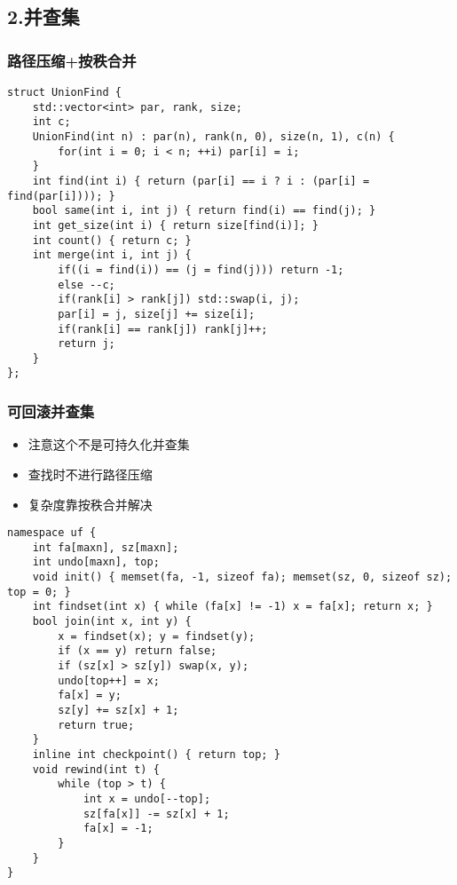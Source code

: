\documentclass[]{article}
\providecommand{\tightlist}{%
  \setlength{\itemsep}{0pt}\setlength{\parskip}{0pt}}
\begin{document}
\hypertarget{ux5e76ux67e5ux96c6}{%
\subsection{2.并查集}\label{ux5e76ux67e5ux96c6}}

\hypertarget{ux8defux5f84ux538bux7f29ux6309ux79e9ux5408ux5e76}{%
\subsubsection{路径压缩+按秩合并}\label{ux8defux5f84ux538bux7f29ux6309ux79e9ux5408ux5e76}}

\begin{verbatim}
struct UnionFind {
    std::vector<int> par, rank, size;
    int c;
    UnionFind(int n) : par(n), rank(n, 0), size(n, 1), c(n) {
        for(int i = 0; i < n; ++i) par[i] = i;
    }
    int find(int i) { return (par[i] == i ? i : (par[i] = find(par[i]))); }
    bool same(int i, int j) { return find(i) == find(j); }
    int get_size(int i) { return size[find(i)]; }
    int count() { return c; }
    int merge(int i, int j) {
        if((i = find(i)) == (j = find(j))) return -1;
        else --c;
        if(rank[i] > rank[j]) std::swap(i, j);
        par[i] = j, size[j] += size[i];
        if(rank[i] == rank[j]) rank[j]++;
        return j;
    }
};
\end{verbatim}

\hypertarget{ux53efux56deux6edaux5e76ux67e5ux96c6}{%
\subsubsection{可回滚并查集}\label{ux53efux56deux6edaux5e76ux67e5ux96c6}}

\begin{itemize}
\tightlist
\item
  注意这个不是可持久化并查集
\item
  查找时不进行路径压缩
\item
  复杂度靠按秩合并解决
\end{itemize}

\begin{verbatim}
namespace uf {
    int fa[maxn], sz[maxn];
    int undo[maxn], top;
    void init() { memset(fa, -1, sizeof fa); memset(sz, 0, sizeof sz); top = 0; }
    int findset(int x) { while (fa[x] != -1) x = fa[x]; return x; }
    bool join(int x, int y) {
        x = findset(x); y = findset(y);
        if (x == y) return false;
        if (sz[x] > sz[y]) swap(x, y);
        undo[top++] = x;
        fa[x] = y;
        sz[y] += sz[x] + 1;
        return true;
    }
    inline int checkpoint() { return top; }
    void rewind(int t) {
        while (top > t) {
            int x = undo[--top];
            sz[fa[x]] -= sz[x] + 1;
            fa[x] = -1;
        }
    }
}
\end{verbatim}
\end{document}

